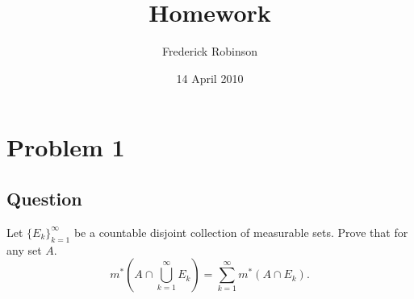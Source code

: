 \documentclass[12pt]{article}
\title{Homework}
\author{Frederick Robinson}
\date{14 April 2010}
\begin{document}

   \maketitle

\setcounter{tocdepth}{2} 


\section{Problem 1}
\subsection{Question}
Let $\{E_k\}_{k=1}^\infty$ be a countable disjoint collection of measurable sets. Prove that for any set $A$.
\[m^*\left( A \cap \bigcup_{k=1}^\infty E_k\right) = \sum_{k=1}^\infty m^*(A \cap E_k).\]
\end{document}
